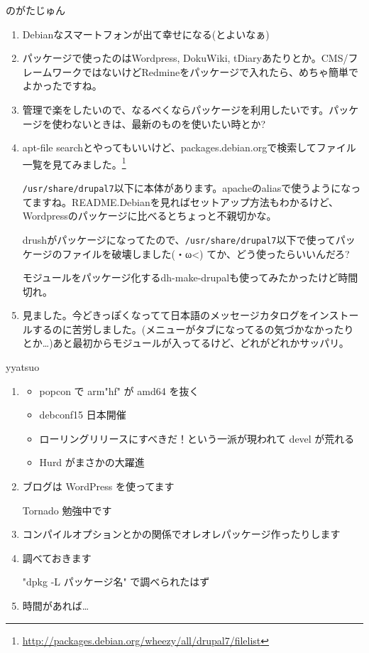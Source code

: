 \documentclass[mingoth,a4paper]{jsarticle}
\begin{document}
\begin{prework}{ のがたじゅん }
  \begin{enumerate}
  \item Debianなスマートフォンが出て幸せになる(とよいなぁ)
  \item パッケージで使ったのはWordpress, DokuWiki, tDiaryあたりとか。CMS/フレームワークではないけどRedmineをパッケージで入れたら、めちゃ簡単でよかったですね。
  \item 管理で楽をしたいので、なるべくならパッケージを利用したいです。パッケージを使わないときは、最新のものを使いたい時とか?
  \item apt-file searchとやってもいいけど、packages.debian.orgで検索してファイル一覧を見てみました。\footnote{\url{http://packages.debian.org/wheezy/all/drupal7/filelist}}

    {\tt /usr/share/drupal7}以下に本体があります。apacheのaliasで使うようになってますね。README.Debianを見ればセットアップ方法もわかるけど、Wordpressのパッケージに比べるとちょっと不親切かな。

    drushがパッケージになってたので、{\tt /usr/share/drupal7}以下で使ってパッケージのファイルを破壊しました(・ω<) てか、どう使ったらいいんだろ?

    モジュールをパッケージ化するdh-make-drupalも使ってみたかったけど時間切れ。
  \item 見ました。今どきっぽくなってて日本語のメッセージカタログをインストールするのに苦労しました。(メニューがタブになってるの気づかなかったりとか…)あと最初からモジュールが入ってるけど、どれがどれかサッパリ。
  \end{enumerate}
\end{prework}

\begin{prework}{ yyatsuo }
  \begin{enumerate}
  \item
    \begin{itemize}
    \item popcon で arm"hf" が amd64 を抜く
    \item debconf15 日本開催
    \item ローリングリリースにすべきだ！という一派が現われて devel が荒れる
    \item Hurd がまさかの大躍進
    \end{itemize}
  \item ブログは WordPress を使ってます

    Tornado 勉強中です
  \item コンパイルオプションとかの関係でオレオレパッケージ作ったりします
  \item 調べておきます

    "dpkg -L パッケージ名" で調べられたはず
  \item 時間があれば…
  \end{enumerate}
\end{prework}
\end{document}
